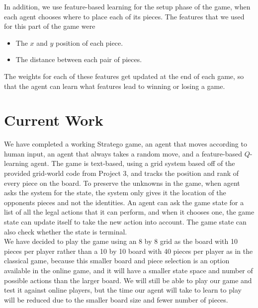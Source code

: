 \documentclass[letterpaper]{article}
\begin{document}
In addition, we use feature-based learning for the setup phase of the game, when each agent chooses where to place each of its pieces. The features that we used for this part of the game were
\begin{itemize}
\item The $x$ and $y$ position of each piece.
\item The distance between each pair of pieces.
\end{itemize}

The weights for each of these features get updated at the end of each game, so that the agent can learn what features lead
to winning or losing a game.


\section{Current Work}

We have completed a working Stratego game, an agent that moves according to human input, an agent that always takes a random move, and a feature-based $Q$-learning agent. The game is text-based, using a grid system based off of the provided grid-world code from Project 3, and tracks the position and rank of every piece on the board. To preserve the unknowns in the game, when agent asks the system for the state, the system only gives it the location of the opponents pieces and not the identities. An agent can ask the game state for a list of all the legal actions that it can perform, and when it chooses one, the game state can update itself to take the new action into account. The game state can also check whether the state is terminal.\\

We have decided to play the game using an 8 by 8 grid as the board with 10 pieces per player rather than a 10 by 10 board with 40 pieces per player as in the classical game, because this smaller board and piece selection is an option available in the online game, and it will have a smaller state space and number of possible actions than the larger board. We will still be able to play our game and test it against online players, but the time our agent will take to learn to play will be reduced due to the smaller board size and fewer number of pieces.\\
\end{document}
